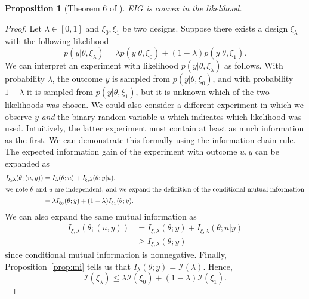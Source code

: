 \documentclass[a4paper, 10pt]{report}
\theoremstyle{plain}
\newtheorem{proposition}[theorem]{Proposition}
\begin{document}
	\begin{proposition}[Theorem 6 of \citet{lindley1956}]
		EIG is convex in the likelihood.
	\end{proposition}
	\begin{proof}
		Let $\lambda \in [0,1]$ and $\xi_0,\xi_1$ be two designs. Suppose there exists a design $\xi_\lambda$ with the following likelihood
		\begin{equation}
		p(y|\theta,\xi_\lambda) = \lambda p(y|\theta,\xi_0) + (1-\lambda)p(y|\theta,\xi_1).
		\end{equation}
		We can interpret an experiment with likelihood $p(y|\theta,\xi_\lambda)$ as follows. 
		With probability $\lambda$, the outcome $y$ is sampled from $p(y|\theta,\xi_0)$, and with probability $1-\lambda$ it is sampled from $p(y|\theta,\xi_1)$, but it is unknown which of the two likelihoods was chosen.
		We could also consider a different experiment in which we observe $y$ \emph{and} the binary random variable $u$ which indicates which likelihood was used. 
		Intuitively, the latter experiment must contain at least as much information as the first. We can demonstrate this formally using the information chain rule.
		The expected information gain of the experiment with outcome $u, y$ can be expanded as
		\begin{align}
		I_{\xi,\lambda}(\theta; (u, y)) &= I_\lambda(\theta; u) + I_{\xi,\lambda}(\theta; y | u), \\
		\intertext{we note $\theta$ and $u$ are independent, and we expand the definition of the conditional mutual information}
		&= \lambda I_{\xi_0}(\theta; y) + (1-\lambda) I_{\xi_1}(\theta; y).
		\end{align}
		We can also expand the same mutual information as
		\begin{align}
		I_{\xi,\lambda}(\theta; (u, y)) &= I_{\xi,\lambda}(\theta; y) + I_{\xi,\lambda}(\theta; u | y) \\
		& \ge I_{\xi,\lambda}(\theta; y)
		\end{align}
		since conditional mutual information is nonnegative. Finally, Proposition~\ref{prop:mi} tells us that $I_\lambda(\theta; y) = \mathcal{I}(\lambda)$. 
		Hence,
		\begin{equation}
		\mathcal{I}(\xi_\lambda) \le \lambda \mathcal{I}(\xi_0) + (1-\lambda) \mathcal{I}(\xi_1).
		\end{equation}
	\end{proof}
	
\end{document}
